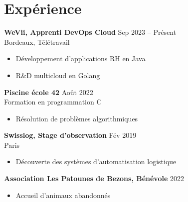 \section{Expérience}\label{sec:experience}
\textbf{WeVii, Apprenti DevOps Cloud} \hfill Sep 2023 -- Présent \\
Bordeaux, Télétravail
\begin{itemize}
    \item Développement d'applications RH en Java
    \item R\&D multicloud en Golang
\end{itemize}

\textbf{Piscine école 42} \hfill Août 2022 \\
Formation en programmation C
\begin{itemize}
    \item Résolution de problèmes algorithmiques
\end{itemize}

\textbf{Swisslog, Stage d'observation} \hfill Fév 2019 \\
Paris
\begin{itemize}
    \item Découverte des systèmes d'automatisation logistique
\end{itemize}

\textbf{Association Les Patounes de Bezons, Bénévole} \hfill 2022 \\
\begin{itemize}
    \item Accueil d'animaux abandonnés
\end{itemize}
